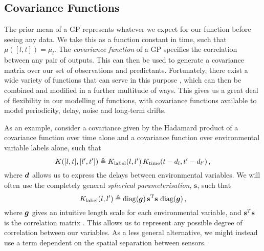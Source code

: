 \documentclass{acmtrans2m}
\begin{document}
\subsection{Covariance Functions}

\noindent The prior mean of a GP represents whatever we expect for our function before seeing any data. We take this as a function constant in time, such that $\mu([l,t])=\mu_l$. The \emph{covariance function} of a GP specifies the correlation between any pair of outputs. This can then be used to generate a covariance matrix over our set of observations and predictants. Fortunately, there exist a wide variety of functions that can serve in this purpose \cite{Abrahamsen,stein2005stc}, which can then be combined and modified in a further multitude of ways. This gives us a great deal of flexibility in our modelling of functions, with covariance functions available to model periodicity, delay, noise and long-term drifts. 

As an example, consider a covariance given by the Hadamard product of a covariance function over time alone and a covariance function over environmental variable labels alone, such that
\begin{equation}
K([l,t],[l',t']) \triangleq K_\text{label}(l,l')\, K_\text{time}(t-d_l,t'-d_{l'})\,,
\end{equation}
where $\boldsymbol{d}$ allows us to express the delays between environmental variables. We will often use the completely general \emph{spherical parameterisation}, $\mathbf{s}$, such that
\begin{equation} \label{eq:spherical_parameterisation}
K_\text{label}(l,l') \triangleq  \operatorname{diag}(\boldsymbol{g})\,\mathbf{s}^{\mathrm{T}} \mathbf{s}\,\operatorname{diag}(\boldsymbol{g})\,,
\end{equation}
where $\boldsymbol{g}$ gives an intuitive length scale for each environmental variable, and $\mathbf{s}^{T}\mathbf{s}$ is the correlation matrix \cite{PinheiroBates}. This allows us to represent any possible degree of correlation between our variables. As a less general alternative, we might instead use a term dependent on the spatial separation between sensors.
\end{document}
